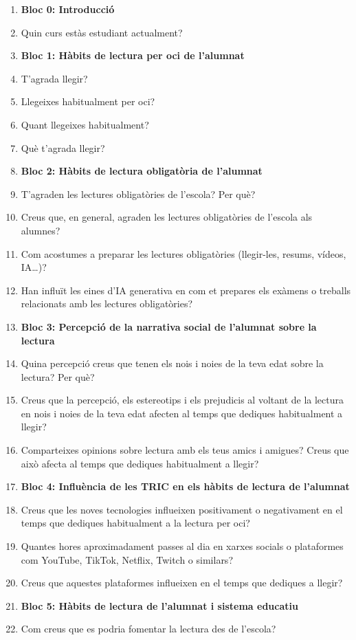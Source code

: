 \documentclass[12pt]{article}
\begin{document}
\begin{enumerate}
    \item [] \hspace{-\leftmargin}\textbf{Bloc 0: Introducció}
    \item Quin curs estàs estudiant actualment?
    \item [] \hspace{-\leftmargin}\textbf{Bloc 1: Hàbits de lectura per oci de l’alumnat}
    \item T’agrada llegir?
    \item Llegeixes habitualment per oci?
    \item Quant llegeixes habitualment?
    \item Què t’agrada llegir?
    \item [] \hspace{-\leftmargin}\textbf{Bloc 2: Hàbits de lectura obligatòria de l’alumnat}
    \item T’agraden les lectures obligatòries de l’escola? Per què?
    \item Creus que, en general, agraden les lectures obligatòries de l’escola als alumnes?
    \item Com acostumes a preparar les lectures obligatòries (llegir-les, resums, vídeos, IA…)?
    \item Han influït les eines d’IA generativa en com et prepares els exàmens o treballs relacionats amb les lectures obligatòries?
    \item [] \hspace{-\leftmargin}\textbf{Bloc 3: Percepció de la narrativa social de l’alumnat sobre la lectura}
    \item Quina percepció creus que tenen els nois i noies de la teva edat sobre la lectura? Per què?
    \item Creus que la percepció, els estereotips i els prejudicis al voltant de la lectura en nois i noies de la teva edat afecten al temps que dediques habitualment a llegir?
    \item Comparteixes opinions sobre lectura amb els teus amics i amigues? Creus que això afecta al temps que dediques habitualment a llegir?
    \item [] \hspace{-\leftmargin}\textbf{Bloc 4: Influència de les TRIC en els hàbits de lectura de l’alumnat}
    \item Creus que les noves tecnologies influeixen positivament o negativament en el temps que dediques habitualment a la lectura per oci?
    \item Quantes hores aproximadament passes al dia en xarxes socials o plataformes com YouTube, TikTok, Netflix, Twitch o similars?
    \item Creus que aquestes plataformes influeixen en el temps que dediques a llegir?
    \item[] \hspace{-\leftmargin}\textbf{Bloc 5: Hàbits de lectura de l’alumnat i sistema educatiu}
    \item Com creus que es podria fomentar la lectura des de l’escola?
\end{enumerate}
\end{document}
